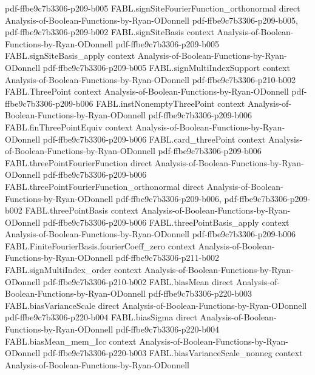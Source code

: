\begin{theorem}
  {pdf-ffbe9c7b3306-p209-b005}
\proofstep
  {FABL.signSiteFourierFunction_orthonormal}
  {direct}
  {Analysis-of-Boolean-Functions-by-Ryan-ODonnell}
  {pdf-ffbe9c7b3306-p209-b005,
    pdf-ffbe9c7b3306-p209-b002}
\proofstep
  {FABL.signSiteBasis}
  {context}
  {Analysis-of-Boolean-Functions-by-Ryan-ODonnell}
  {pdf-ffbe9c7b3306-p209-b005}
\proofstep
  {FABL.signSiteBasis_apply}
  {context}
  {Analysis-of-Boolean-Functions-by-Ryan-ODonnell}
  {pdf-ffbe9c7b3306-p209-b005}
\proofstep
  {FABL.signMultiIndexSupport}
  {context}
  {Analysis-of-Boolean-Functions-by-Ryan-ODonnell}
  {pdf-ffbe9c7b3306-p210-b002}
\proofstep
  {FABL.ThreePoint}
  {context}
  {Analysis-of-Boolean-Functions-by-Ryan-ODonnell}
  {pdf-ffbe9c7b3306-p209-b006}
\proofstep
  {FABL.instNonemptyThreePoint}
  {context}
  {Analysis-of-Boolean-Functions-by-Ryan-ODonnell}
  {pdf-ffbe9c7b3306-p209-b006}
\proofstep
  {FABL.finThreePointEquiv}
  {context}
  {Analysis-of-Boolean-Functions-by-Ryan-ODonnell}
  {pdf-ffbe9c7b3306-p209-b006}
\proofstep
  {FABL.card_threePoint}
  {context}
  {Analysis-of-Boolean-Functions-by-Ryan-ODonnell}
  {pdf-ffbe9c7b3306-p209-b006}
\proofstep
  {FABL.threePointFourierFunction}
  {direct}
  {Analysis-of-Boolean-Functions-by-Ryan-ODonnell}
  {pdf-ffbe9c7b3306-p209-b006}
\proofstep
  {FABL.threePointFourierFunction_orthonormal}
  {direct}
  {Analysis-of-Boolean-Functions-by-Ryan-ODonnell}
  {pdf-ffbe9c7b3306-p209-b006,
    pdf-ffbe9c7b3306-p209-b002}
\proofstep
  {FABL.threePointBasis}
  {context}
  {Analysis-of-Boolean-Functions-by-Ryan-ODonnell}
  {pdf-ffbe9c7b3306-p209-b006}
\proofstep
  {FABL.threePointBasis_apply}
  {context}
  {Analysis-of-Boolean-Functions-by-Ryan-ODonnell}
  {pdf-ffbe9c7b3306-p209-b006}
\proofstep
  {FABL.FiniteFourierBasis.fourierCoeff_zero}
  {context}
  {Analysis-of-Boolean-Functions-by-Ryan-ODonnell}
  {pdf-ffbe9c7b3306-p211-b002}
\proofstep
  {FABL.signMultiIndex_order}
  {context}
  {Analysis-of-Boolean-Functions-by-Ryan-ODonnell}
  {pdf-ffbe9c7b3306-p210-b002}
\proofstep
  {FABL.biasMean}
  {direct}
  {Analysis-of-Boolean-Functions-by-Ryan-ODonnell}
  {pdf-ffbe9c7b3306-p220-b003}
\proofstep
  {FABL.biasVarianceScale}
  {direct}
  {Analysis-of-Boolean-Functions-by-Ryan-ODonnell}
  {pdf-ffbe9c7b3306-p220-b004}
\proofstep
  {FABL.biasSigma}
  {direct}
  {Analysis-of-Boolean-Functions-by-Ryan-ODonnell}
  {pdf-ffbe9c7b3306-p220-b004}
\proofstep
  {FABL.biasMean_mem_Icc}
  {context}
  {Analysis-of-Boolean-Functions-by-Ryan-ODonnell}
  {pdf-ffbe9c7b3306-p220-b003}
\proofstep
  {FABL.biasVarianceScale_nonneg}
  {context}
  {Analysis-of-Boolean-Functions-by-Ryan-ODonnell}

\end{theorem}
